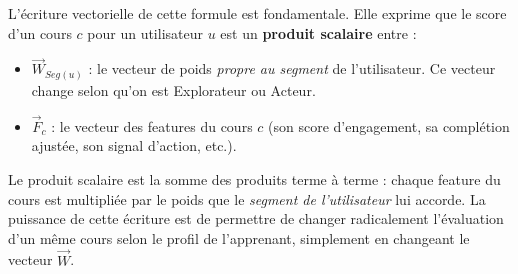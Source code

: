 \documentclass[11pt,a4paper]{article}
\begin{document}
L'écriture vectorielle de cette formule est fondamentale. Elle exprime que le score d'un cours $c$ pour un utilisateur $u$ est un \textbf{produit scalaire} entre :
\begin{itemize}
    \item $\vec{W}_{Seg(u)}$ : le vecteur de poids \textit{propre au segment} de l'utilisateur. Ce vecteur change selon qu'on est Explorateur ou Acteur.
    \item $\vec{F}_c$ : le vecteur des features du cours $c$ (son score d'engagement, sa complétion ajustée, son signal d'action, etc.).
\end{itemize}

Le produit scalaire est la somme des produits terme à terme : chaque feature du cours est multipliée par le poids que le \textit{segment de l'utilisateur} lui accorde. La puissance de cette écriture est de permettre de changer radicalement l'évaluation d'un même cours selon le profil de l'apprenant, simplement en changeant le vecteur $\vec{W}$.
\end{document}
